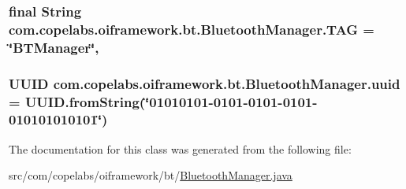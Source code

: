 \subsubsection[{T\+A\+G}]{\setlength{\rightskip}{0pt plus 5cm}final String com.\+copelabs.\+oiframework.\+bt.\+Bluetooth\+Manager.\+T\+A\+G = \char`\"{}B\+T\+Manager\char`\"{}\hspace{0.3cm}{\ttfamily [static]}, {\ttfamily [private]}}\label{classcom_1_1copelabs_1_1oiframework_1_1bt_1_1_bluetooth_manager_a31972c4556d61ec9c2b026a5dfb60721}
\hypertarget{classcom_1_1copelabs_1_1oiframework_1_1bt_1_1_bluetooth_manager_a952650efe65f696e04b4a3a780db7c87}{}
\subsubsection[{uuid}]{\setlength{\rightskip}{0pt plus 5cm}U\+U\+I\+D com.\+copelabs.\+oiframework.\+bt.\+Bluetooth\+Manager.\+uuid = U\+U\+I\+D.\+from\+String(\char`\"{}01010101-\/0101-\/0101-\/0101-\/010101010101\char`\"{})\hspace{0.3cm}{\ttfamily [private]}}\label{classcom_1_1copelabs_1_1oiframework_1_1bt_1_1_bluetooth_manager_a952650efe65f696e04b4a3a780db7c87}


The documentation for this class was generated from the following file\+:\begin{DoxyCompactItemize}
\item 
src/com/copelabs/oiframework/bt/\hyperlink{_bluetooth_manager_8java}{Bluetooth\+Manager.\+java}\end{DoxyCompactItemize}
